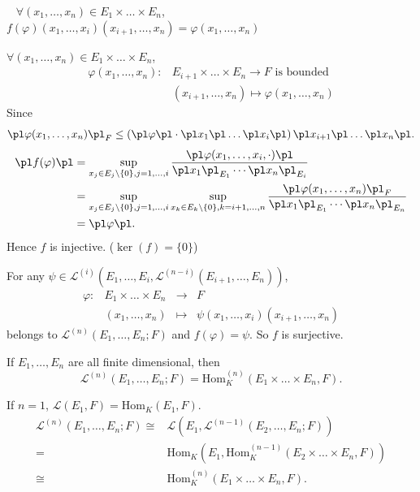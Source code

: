 \begin{remark}
    \ \newline
    $\forall (x_1,\ldots,x_n)\in E_1\times\ldots\times E_n$, $f(\varphi)(x_1,\ldots,x_i)(x_{i+1},\ldots,x_n)=\varphi(x_1,\ldots,x_n)$
\end{remark}
\begin{proofenv}
    $\forall (x_1,\ldots,x_n)\in E_1\times\ldots\times E_n$, 
    \begin{align*}
        \varphi(x_1,\ldots,x_n):&E_{i+1}\times\ldots\times E_n\longrightarrow F \text{ is bounded }\\
        &(x_{i+1},\ldots,x_n)\longmapsto \varphi(x_1,\ldots,x_n)
    \end{align*}
    Since 
    $$\pl\varphi(x_1,\ldots,x_n)\pl_F\le \left(\pl\varphi\pl\cdot\pl x_1\pl\ldots\pl x_i\pl\right)\pl x_{i+1}\pl\ldots\pl x_n\pl.$$
    \begin{align*}
        \pl f(\varphi)\pl&=\sup_{x_j\in E_j\setminus\{0\},j=1,\ldots,i}\frac{\pl \varphi(x_1,\ldots,x_i,\cdot)\pl}{\pl x_1\pl_{E_1}\cdots \pl x_n\pl_{E_i}}\\
        &=\sup_{x_j\in E_j\setminus\{0\},j=1,\ldots,i}\sup_{x_k\in E_k\setminus\{0\},k=i+1,\ldots,n}\frac{\pl \varphi(x_1,\ldots,x_n)\pl_F}{\pl x_1\pl_{E_1}\cdots \pl x_n\pl_{E_n}}\\
        &=\pl \varphi\pl.
    \end{align*}
    Hence $f$ is injective. ($\ker(f)=\{0\}$)

    For any $\psi\in \mathscr{L}^{(i)}(E_1,\ldots,E_i,\mathscr{L}^{(n-i)}(E_{i+1},\ldots,E_n))$,
    $$\begin{array}{rrcl}
        \varphi:&E_1\times\ldots\times E_n&\longrightarrow &F\\
        &(x_1,\ldots,x_n)&\longmapsto &\psi(x_1,\ldots,x_i)(x_{i+1},\ldots,x_n)
    \end{array}$$
    belongs to $\mathscr{L}^{(n)}(E_1,\ldots,E_n;F)$ and $f(\varphi)=\psi$. So $f$ is surjective.
\end{proofenv}
\begin{corollaryenv}
    If $E_1,\ldots,E_n$ are all finite dimensional, then 
    $$\mathscr{L}^{(n)}(E_1,\ldots,E_n;F)=\mathrm{Hom}_{K}^{(n)}(E_1\times\ldots\times E_n,F).$$ 
\end{corollaryenv}
\begin{proofenv}
    If $n=1$, $\mathscr{L}(E_1,F)=\mathrm{Hom}_{K}(E_1,F)$.
    \begin{align*}
        \mathscr{L}^{(n)}(E_1,\ldots,E_n;F)
        \cong &\mathscr{L}(E_1,\mathscr{L}^{(n-1)}(E_2,\ldots,E_n;F))\\
        = &\mathrm{Hom}_{K}(E_1,\mathrm{Hom}_{K}^{(n-1)}(E_2\times\ldots\times E_n,F))\\
        \cong &\mathrm{Hom}_{K}^{(n)}(E_1\times\ldots\times E_n,F).
    \end{align*}
\end{proofenv}

